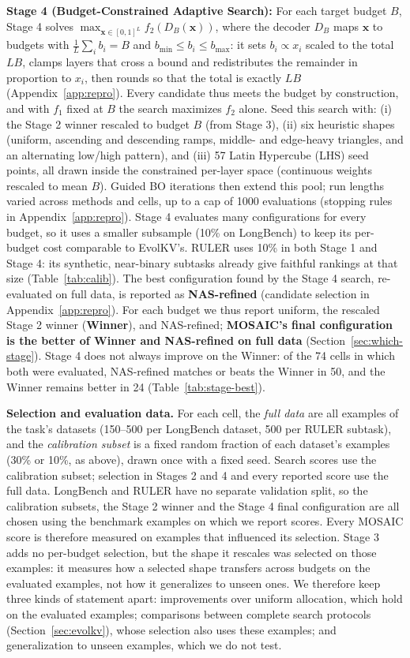 \documentclass[11pt]{article}
\begin{document}
\textbf{Stage 4 (Budget-Constrained Adaptive Search):} For each target budget $B$, Stage 4 solves $\max_{\mathbf{x} \in [0,1]^L} f_2(D_B(\mathbf{x}))$, where the decoder $D_B$ maps $\mathbf{x}$ to budgets with $\frac{1}{L}\sum_i b_i = B$ and $b_{\min} \le b_i \le b_{\max}$: it sets $b_i \propto x_i$ scaled to the total $LB$, clamps layers that cross a bound and redistributes the remainder in proportion to $x_i$, then rounds so that the total is exactly $LB$ (Appendix~\ref{app:repro}). Every candidate thus meets the budget by construction, and with $f_1$ fixed at $B$ the search maximizes $f_2$ alone. Seed this search with: (i) the Stage 2 winner rescaled to budget $B$ (from Stage 3), (ii) six heuristic shapes (uniform, ascending and descending ramps, middle- and edge-heavy triangles, and an alternating low/high pattern), and (iii) 57 Latin Hypercube (LHS) seed points, all drawn inside the constrained per-layer space (continuous weights rescaled to mean $B$). Guided BO iterations then extend this pool; run lengths varied across methods and cells, up to a cap of 1000 evaluations (stopping rules in Appendix~\ref{app:repro}). Stage 4 evaluates many configurations for every budget, so it uses a smaller subsample (10\% on LongBench) to keep its per-budget cost comparable to EvolKV's. RULER uses 10\% in both Stage 1 and Stage 4: its synthetic, near-binary subtasks already give faithful rankings at that size (Table~\ref{tab:calib}). The best configuration found by the Stage 4 search, re-evaluated on full data, is reported as \textbf{NAS-refined} (candidate selection in Appendix~\ref{app:repro}). For each budget we thus report uniform, the rescaled Stage 2 winner (\textbf{Winner}), and NAS-refined; \textbf{MOSAIC's final configuration is the better of Winner and NAS-refined on full data} (Section~\ref{sec:which-stage}). Stage 4 does not always improve on the Winner: of the 74 cells in which both were evaluated, NAS-refined matches or beats the Winner in 50, and the Winner remains better in 24 (Table~\ref{tab:stage-best}).

\textbf{Selection and evaluation data.} For each cell, the \emph{full data} are all examples of the task's datasets (150--500 per LongBench dataset, 500 per RULER subtask), and the \emph{calibration subset} is a fixed random fraction of each dataset's examples (30\% or 10\%, as above), drawn once with a fixed seed. Search scores use the calibration subset; selection in Stages 2 and 4 and every reported score use the full data. LongBench and RULER have no separate validation split, so the calibration subsets, the Stage 2 winner and the Stage 4 final configuration are all chosen using the benchmark examples on which we report scores. Every MOSAIC score is therefore measured on examples that influenced its selection. Stage 3 adds no per-budget selection, but the shape it rescales was selected on those examples: it measures how a selected shape transfers across budgets on the evaluated examples, not how it generalizes to unseen ones. We therefore keep three kinds of statement apart: improvements over uniform allocation, which hold on the evaluated examples; comparisons between complete search protocols (Section~\ref{sec:evolkv}), whose selection also uses these examples; and generalization to unseen examples, which we do not test.
\end{document}
